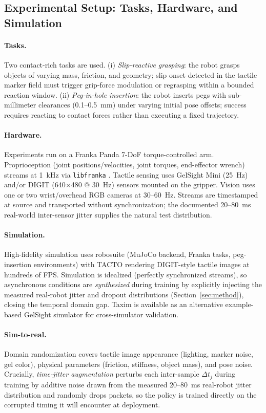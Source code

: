 \documentclass[conference]{IEEEtran}
\begin{document}
\subsection{Experimental Setup: Tasks, Hardware, and Simulation}
\paragraph{Tasks.}
Two contact-rich tasks are used. (i) \emph{Slip-reactive grasping}: the robot grasps objects of varying mass, friction, and geometry; slip onset detected in the tactile marker field must trigger grip-force modulation or regrasping within a bounded reaction window. (ii) \emph{Peg-in-hole insertion}: the robot inserts pegs with sub-millimeter clearances (0.1--0.5~mm) under varying initial pose offsets; success requires reacting to contact forces rather than executing a fixed trajectory.

\paragraph{Hardware.}
Experiments run on a Franka Panda 7-DoF torque-controlled arm. Proprioception (joint positions/velocities, joint torques, end-effector wrench) streams at 1~kHz via \texttt{libfranka} \cite{franka_libfranka}. Tactile sensing uses GelSight Mini (25~Hz) \cite{gelsight_sdk} and/or DIGIT (640$\times$480 @ 30~Hz) \cite{lambeta2020digit} sensors mounted on the gripper. Vision uses one or two wrist/overhead RGB cameras at 30--60~Hz. Streams are timestamped at source and transported without synchronization; the documented 20--80~ms real-world inter-sensor jitter supplies the natural test distribution.

\paragraph{Simulation.}
High-fidelity simulation uses robosuite \cite{zhu2020robosuite} (MuJoCo backend, Franka tasks, peg-insertion environments) with TACTO \cite{wang2022tacto} rendering DIGIT-style tactile images at hundreds of FPS. Simulation is idealized (perfectly synchronized streams), so asynchronous conditions are \emph{synthesized} during training by explicitly injecting the measured real-robot jitter and dropout distributions (Section~\ref{sec:method}), closing the temporal domain gap. Taxim \cite{si2021taxim} is available as an alternative example-based GelSight simulator for cross-simulator validation.

\paragraph{Sim-to-real.}
Domain randomization covers tactile image appearance (lighting, marker noise, gel color), physical parameters (friction, stiffness, object mass), and pose noise. Crucially, \emph{time-jitter augmentation} perturbs each inter-sample $\Delta t_j$ during training by additive noise drawn from the measured 20--80~ms real-robot jitter distribution and randomly drops packets, so the policy is trained directly on the corrupted timing it will encounter at deployment.
\end{document}
